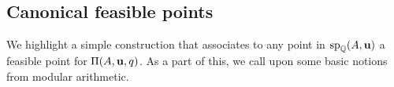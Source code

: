 \documentclass[11pt]{amsart}
\begin{document}




\subsection{Canonical feasible points}  We highlight a simple construction that associates to any point in $\operatorname{sp}_{\mathbb{Q}}(A, \mathbf{u})$ a feasible point for $\Pi(A, \mathbf{u}, q)$.  As a part of this, we call upon some basic notions from modular arithmetic.   
\end{document}
